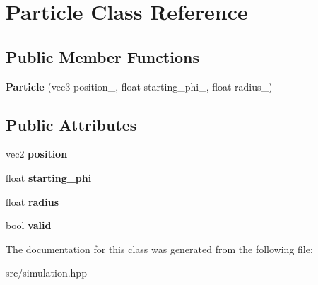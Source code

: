 \hypertarget{classParticle}{}\section{Particle Class Reference}
\label{classParticle}
\subsection*{Public Member Functions}
\begin{DoxyCompactItemize}
\item 
\mbox{\label{classParticle_a98784ea765eae8715cfac8608e165f9d}} 
{\bfseries Particle} (vec3 position\+\_\+, float starting\+\_\+phi\+\_\+, float radius\+\_\+)
\end{DoxyCompactItemize}
\subsection*{Public Attributes}
\begin{DoxyCompactItemize}
\item 
\mbox{\label{classParticle_a4e2f0aec4261adfc8080af6b6a5233c9}} 
vec2 {\bfseries position}
\item 
\mbox{\label{classParticle_a29f0e77628f3ad2c3a77eb577ca99a0f}} 
float {\bfseries starting\+\_\+phi}
\item 
\mbox{\label{classParticle_a3a9c8ec502deee9e17355867563e55dc}} 
float {\bfseries radius}
\item 
\mbox{\label{classParticle_ae5815d2adaae1746f2860218b59ceb51}} 
bool {\bfseries valid}
\end{DoxyCompactItemize}


The documentation for this class was generated from the following file\+:\begin{DoxyCompactItemize}
\item 
src/simulation.\+hpp\end{DoxyCompactItemize}

